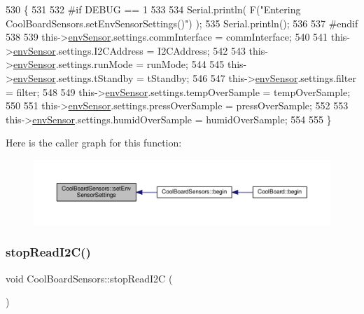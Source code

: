 \begin{DoxyCode}
530 \{
531 
532 \textcolor{preprocessor}{#if DEBUG == 1}
533     
534     Serial.println( F(\textcolor{stringliteral}{"Entering CoolBoardSensors.setEnvSensorSettings()"}) );
535     Serial.println();
536 
537 \textcolor{preprocessor}{#endif}
538   
539     this->\hyperlink{classCoolBoardSensors_a868e38985e9a2412829fa2790ca13e2e}{envSensor}.settings.commInterface = commInterface;      
540 
541     this->\hyperlink{classCoolBoardSensors_a868e38985e9a2412829fa2790ca13e2e}{envSensor}.settings.I2CAddress = I2CAddress;
542 
543     this->\hyperlink{classCoolBoardSensors_a868e38985e9a2412829fa2790ca13e2e}{envSensor}.settings.runMode = runMode; 
544 
545     this->\hyperlink{classCoolBoardSensors_a868e38985e9a2412829fa2790ca13e2e}{envSensor}.settings.tStandby = tStandby; 
546 
547     this->\hyperlink{classCoolBoardSensors_a868e38985e9a2412829fa2790ca13e2e}{envSensor}.settings.filter = filter; 
548 
549     this->\hyperlink{classCoolBoardSensors_a868e38985e9a2412829fa2790ca13e2e}{envSensor}.settings.tempOverSample = tempOverSample;
550 
551     this->\hyperlink{classCoolBoardSensors_a868e38985e9a2412829fa2790ca13e2e}{envSensor}.settings.pressOverSample = pressOverSample;
552 
553     this->\hyperlink{classCoolBoardSensors_a868e38985e9a2412829fa2790ca13e2e}{envSensor}.settings.humidOverSample = humidOverSample;
554 
555 \}
\end{DoxyCode}
Here is the caller graph for this function\+:
\nopagebreak
\begin{figure}[H]
\begin{center}
\leavevmode
\includegraphics[width=350pt]{classCoolBoardSensors_a406307ffd70272282d91479c7ed8d66f_icgraph}
\end{center}
\end{figure}
\mbox{\label{classCoolBoardSensors_ab67b900b9e5e7c18d52d2d9107ba171b}} 
\subsubsection{\texorpdfstring{stop\+Read\+I2\+C()}{stopReadI2C()}}
{\footnotesize\ttfamily void Cool\+Board\+Sensors\+::stop\+Read\+I2C (\begin{DoxyParamCaption}{ }\end{DoxyParamCaption})}

